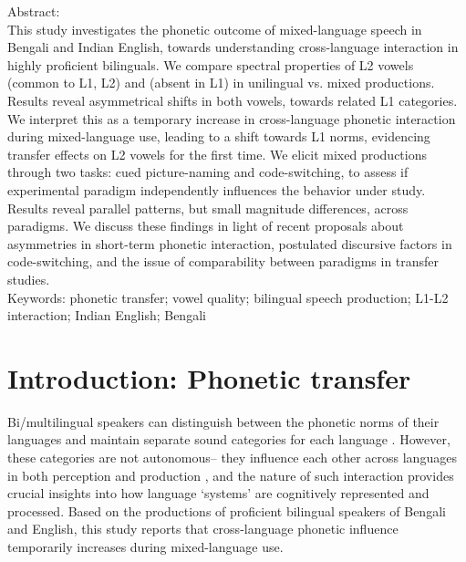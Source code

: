 \documentclass[12 pt]{article}
\newcommand{\nt}[1]{\textipa{[#1]}} %
\newlength\mystoreparindent
\newenvironment{myparindent}[1]{%
	\setlength{\mystoreparindent}{\the\parindent}
	\setlength{\parindent}{#1}
}{%
	\setlength{\parindent}{\mystoreparindent}
}
\begin{document}
\newpage
\begin{myparindent}{0pt}
Abstract:\\
This study investigates the phonetic outcome of mixed-language speech in Bengali and Indian English, towards understanding cross-language interaction in highly proficient bilinguals.  We compare spectral properties of L2 vowels \nt{\ae} (common to L1, L2) and \nt{2} (absent in L1) in unilingual vs. mixed productions. Results reveal asymmetrical shifts in both vowels, towards related L1 categories. We interpret this as a temporary increase in cross-language phonetic interaction during mixed-language use, leading to a shift towards L1 norms, evidencing transfer effects on L2 vowels for the first time. We elicit mixed productions through two tasks: cued picture-naming and code-switching, to assess if experimental paradigm independently influences the behavior under study. Results reveal parallel patterns, but small magnitude differences, across paradigms. We discuss these findings in light of recent proposals about asymmetries in short-term phonetic interaction, postulated discursive factors in code-switching, and the issue of comparability between paradigms in transfer studies. \\


Keywords: phonetic transfer; vowel quality; bilingual speech production; L1-L2 interaction; Indian English; Bengali 

\end{myparindent}

\newpage

\section{Introduction: Phonetic transfer}\label{introduction}

Bi/multilingual speakers can distinguish between the phonetic norms of their languages and maintain separate sound categories for each language \citep{caramazza1973acquisition,macleod2010impact,bosch2003simultaneous}. However, these categories are not autonomous-- they influence each other across languages in both perception and production \citep[e.g.][]{flege1995second,fowler2008cross,flege2002assessing}, and the nature of such interaction provides crucial insights into how language `systems' are cognitively represented and processed. Based on the productions of proficient bilingual speakers of Bengali and English, this study reports that cross-language phonetic influence temporarily increases during mixed-language use.%
\end{document}
